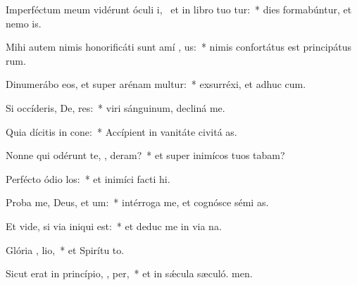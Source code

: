 \item Imperféctum meum vidérunt óculi i,~\pscross{} et in libro tuo  tur:~* dies formabúntur, et nemo  is.
\item Mihi autem nimis honorificáti sunt amí , us:~* nimis confortátus est principátus rum.
\item Dinumerábo eos, et super arénam multur:~* exsurréxi, et adhuc  cum.
\item Si occíderis, De, res:~* viri sánguinum, decliná  me.
\item Quia dícitis in cone:~* Accípient in vanitáte civitá as.
\item Nonne qui odérunt te, , deram?~* et super inimícos tuos tabam?
\item Perfécto ódio  los:~* et inimíci facti  hi.
\item Proba me, Deus, et   um:~* intérroga me, et cognósce sémi as.
\item Et vide, si via iniqui   est:~* et deduc me in via na.
\item Glória ,  lio,~* et Spirítu to.
\item Sicut erat in princípio,  ,  per,~* et in sǽcula sæculó. men.
